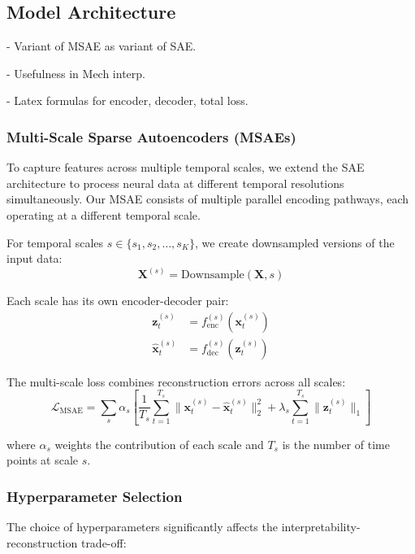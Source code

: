 \subsection{Model Architecture}

- Variant of MSAE as variant of SAE.

- Usefulness in Mech interp.

- Latex formulas for encoder, decoder, total loss.

\subsubsection{Multi-Scale Sparse Autoencoders (MSAEs)}

To capture features across multiple temporal scales, we extend the SAE architecture to process neural data at different temporal resolutions simultaneously. Our MSAE consists of multiple parallel encoding pathways, each operating at a different temporal scale.

For temporal scales $s \in \{s_1, s_2, \ldots, s_K\}$, we create downsampled versions of the input data:
\begin{equation}
\mathbf{X}^{(s)} = \text{Downsample}(\mathbf{X}, s)
\end{equation}

Each scale has its own encoder-decoder pair:
\begin{align}
\mathbf{z}_t^{(s)} &= f_{\text{enc}}^{(s)}(\mathbf{x}_t^{(s)}) \\
\hat{\mathbf{x}}_t^{(s)} &= f_{\text{dec}}^{(s)}(\mathbf{z}_t^{(s)})
\end{align}

The multi-scale loss combines reconstruction errors across all scales:
\begin{equation}
\mathcal{L}_{\text{MSAE}} = \sum_{s} \alpha_s \left[ \frac{1}{T_s} \sum_{t=1}^{T_s} \|\mathbf{x}_t^{(s)} - \hat{\mathbf{x}}_t^{(s)}\|_2^2 + \lambda_s \sum_{t=1}^{T_s} \|\mathbf{z}_t^{(s)}\|_1 \right]
\end{equation}

where $\alpha_s$ weights the contribution of each scale and $T_s$ is the number of time points at scale $s$.

\subsubsection{Hyperparameter Selection}

The choice of hyperparameters significantly affects the interpretability-reconstruction trade-off:

